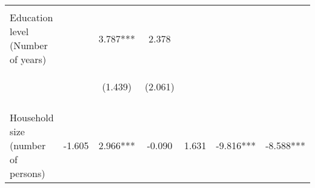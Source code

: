 \begin{center}
\begin{tabular}{lcccccc}
\vspace{4pt} & \begin{footnotesize}\end{footnotesize} & \begin{footnotesize}[0.164]\end{footnotesize} & \begin{footnotesize}[0.338]\end{footnotesize} & \begin{footnotesize}\end{footnotesize} & \begin{footnotesize}\end{footnotesize} & \begin{footnotesize}\end{footnotesize} \\
Education level (Number of years) &  & 3.787*** & 2.378 &  &  &  \\
 & \begin{footnotesize}\end{footnotesize} & \begin{footnotesize}(1.439)\end{footnotesize} & \begin{footnotesize}(2.061)\end{footnotesize} & \begin{footnotesize}\end{footnotesize} & \begin{footnotesize}\end{footnotesize} & \begin{footnotesize}\end{footnotesize} \\
\vspace{4pt} & \begin{footnotesize}\end{footnotesize} & \begin{footnotesize}[0.008]\end{footnotesize} & \begin{footnotesize}[0.249]\end{footnotesize} & \begin{footnotesize}\end{footnotesize} & \begin{footnotesize}\end{footnotesize} & \begin{footnotesize}\end{footnotesize} \\
Household size (number of persons) & -1.605 & 2.966*** & -0.090 & 1.631 & -9.816*** & -8.588*** \\

\end{tabular}
\end{center}

